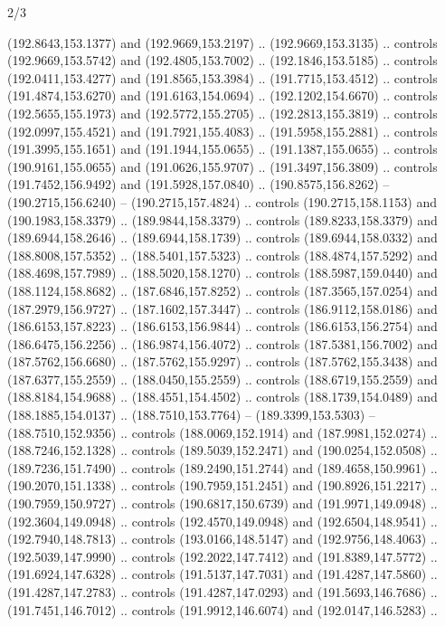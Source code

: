 \begin{flagdescription}{2/3}
\begin{scope}[xshift=0.5\flaglength,yshift=0.5\flagwidth,scale=\flagwidth/180]
\begin{scope}[y=0.8pt, x=0.8pt, yscale=-1,shift={(-168.75,-108.75)}]
  (192.8643,153.1377) and (192.9669,153.2197) .. (192.9669,153.3135) .. controls
  (192.9669,153.5742) and (192.4805,153.7002) .. (192.1846,153.5185) .. controls
  (192.0411,153.4277) and (191.8565,153.3984) .. (191.7715,153.4512) .. controls
  (191.4874,153.6270) and (191.6163,154.0694) .. (192.1202,154.6670) .. controls
  (192.5655,155.1973) and (192.5772,155.2705) .. (192.2813,155.3819) .. controls
  (192.0997,155.4521) and (191.7921,155.4083) .. (191.5958,155.2881) .. controls
  (191.3995,155.1651) and (191.1944,155.0655) .. (191.1387,155.0655) .. controls
  (190.9161,155.0655) and (191.0626,155.9707) .. (191.3497,156.3809) .. controls
  (191.7452,156.9492) and (191.5928,157.0840) .. (190.8575,156.8262) --
  (190.2715,156.6240) -- (190.2715,157.4824) .. controls (190.2715,158.1153) and
  (190.1983,158.3379) .. (189.9844,158.3379) .. controls (189.8233,158.3379) and
  (189.6944,158.2646) .. (189.6944,158.1739) .. controls (189.6944,158.0332) and
  (188.8008,157.5352) .. (188.5401,157.5323) .. controls (188.4874,157.5292) and
  (188.4698,157.7989) .. (188.5020,158.1270) .. controls (188.5987,159.0440) and
  (188.1124,158.8682) .. (187.6846,157.8252) .. controls (187.3565,157.0254) and
  (187.2979,156.9727) .. (187.1602,157.3447) .. controls (186.9112,158.0186) and
  (186.6153,157.8223) .. (186.6153,156.9844) .. controls (186.6153,156.2754) and
  (186.6475,156.2256) .. (186.9874,156.4072) .. controls (187.5381,156.7002) and
  (187.5762,156.6680) .. (187.5762,155.9297) .. controls (187.5762,155.3438) and
  (187.6377,155.2559) .. (188.0450,155.2559) .. controls (188.6719,155.2559) and
  (188.8184,154.9688) .. (188.4551,154.4502) .. controls (188.1739,154.0489) and
  (188.1885,154.0137) .. (188.7510,153.7764) -- (189.3399,153.5303) --
  (188.7510,152.9356) .. controls (188.0069,152.1914) and (187.9981,152.0274) ..
  (188.7246,152.1328) .. controls (189.5039,152.2471) and (190.0254,152.0508) ..
  (189.7236,151.7490) .. controls (189.2490,151.2744) and (189.4658,150.9961) ..
  (190.2070,151.1338) .. controls (190.7959,151.2451) and (190.8926,151.2217) ..
  (190.7959,150.9727) .. controls (190.6817,150.6739) and (191.9971,149.0948) ..
  (192.3604,149.0948) .. controls (192.4570,149.0948) and (192.6504,148.9541) ..
  (192.7940,148.7813) .. controls (193.0166,148.5147) and (192.9756,148.4063) ..
  (192.5039,147.9990) .. controls (192.2022,147.7412) and (191.8389,147.5772) ..
  (191.6924,147.6328) .. controls (191.5137,147.7031) and (191.4287,147.5860) ..
  (191.4287,147.2783) .. controls (191.4287,147.0293) and (191.5693,146.7686) ..
  (191.7451,146.7012) .. controls (191.9912,146.6074) and (192.0147,146.5283) ..

\end{scope}
\end{scope}
\end{flagdescription}
